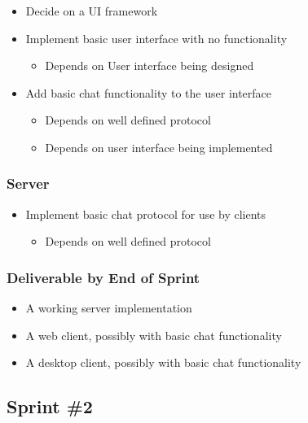 \documentclass[11pt]{article}
\begin{document}
\begin{itemize}
\item Decide on a UI framework
\item Implement basic user interface with no functionality
\begin{itemize}
\item Depends on User interface being designed
\end{itemize}
\item Add basic chat functionality to the user interface
\begin{itemize}
\item Depends on well defined protocol
\item Depends on user interface being implemented
\end{itemize}
\end{itemize}

\subsubsection{Server}
\label{sec-4-1-2}

\begin{itemize}
\item Implement basic chat protocol for use by clients
\begin{itemize}
\item Depends on well defined protocol
\end{itemize}
\end{itemize}

\subsubsection{Deliverable by End of Sprint}
\label{sec-4-1-3}

\begin{itemize}
\item A working server implementation
\item A web client, possibly with basic chat functionality
\item A desktop client, possibly with basic chat functionality
\end{itemize}

\subsection{Sprint \#2}
\label{sec-4-2}
\end{document}

